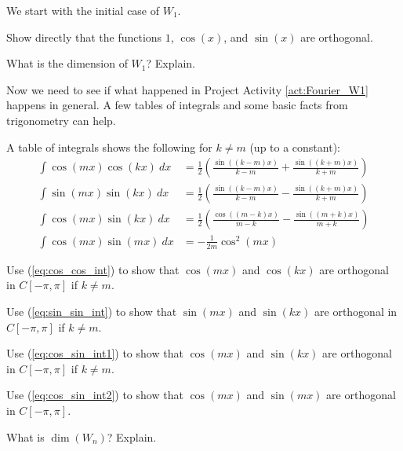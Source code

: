 \label{ex:W1}

\begin{pactivity} \label{act:Fourier_W1} We start with the initial case of $W_1$.
	\ba
	\item Show directly that the functions $1$, $\cos(x)$, and $\sin(x)$ are orthogonal.


	\item What is the dimension of $W_1$? Explain.
	
	\ea

\end{pactivity}

Now we need to see if what happened in Project Activity \ref{act:Fourier_W1}  happens in general. A few tables of integrals and some basic facts from trigonometry can help.

\begin{pactivity} \label{act:Fourier_Wn} A table of integrals shows the following for $k \neq m$ (up to a constant):
\begin{align}
\int \cos(mx)\cos(kx) \ dx &= \frac{1}{2} \left( \frac{\sin((k-m)x)}{k-m} + \frac{\sin((k+m)x)}{k+m} \right)  \label{eq:cos_cos_int} \\
\int \sin(mx)\sin(kx) \ dx &= \frac{1}{2} \left( \frac{\sin((k-m)x)}{k-m} - \frac{\sin((k+m)x)}{k+m} \right)   \label{eq:sin_sin_int} \\
\int \cos(mx)\sin(kx) \ dx &= \frac{1}{2} \left( \frac{\cos((m-k)x)}{m-k} - \frac{\sin((m+k)x)}{m+k} \right)  \label{eq:cos_sin_int1} \\
\int \cos(mx)\sin(mx) \ dx &= -\frac{1}{2m} \cos^2(mx)  \label{eq:cos_sin_int2}
\end{align}
	\ba
	\item Use (\ref{eq:cos_cos_int}) to show that $\cos(mx)$ and $\cos(kx)$ are orthogonal in $C[-\pi,\pi]$ if $k \neq m$. 


	\item Use (\ref{eq:sin_sin_int}) to show that $\sin(mx)$ and $\sin(kx)$ are orthogonal in $C[-\pi,\pi]$ if $k \neq m$.

	
	\item Use (\ref{eq:cos_sin_int1}) to show that $\cos(mx)$ and $\sin(kx)$ are orthogonal in $C[-\pi,\pi]$ if $k \neq m$.

	
	\item Use (\ref{eq:cos_sin_int2}) to show that $\cos(mx)$ and $\sin(mx)$ are orthogonal in $C[-\pi,\pi]$.

	
	\item What is $\dim(W_n)$? Explain.
	
	\ea
\end{pactivity}

